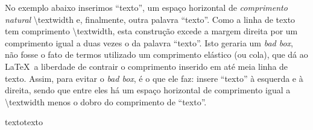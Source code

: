 \documentclass[a4paper,12pt]{article}
\newcommand{\comando}[1]{{\textbackslash\color{blue!70}\normalfont #1}}
\newcommand{\foreign}[1]{\textsl{#1}}
\begin{document}
	
	No exemplo abaixo inserimos ``texto'', um espaço horizontal de \emph{comprimento natural} \comando{textwidth} e, finalmente, outra palavra ``texto''. Como a linha de texto tem comprimento \comando{textwidth}, esta construção excede a margem direita por um comprimento igual a duas vezes o da palavra ``texto''. Isto geraria um \foreign{bad box}, não fosse o fato de termos utilizado um comprimento elástico (ou cola), que dá ao \LaTeX\ a liberdade de contrair o comprimento inserido em até meia linha de texto. Assim, para evitar o \foreign{bad box}, é o que ele faz: insere ``texto'' à esquerda e à direita, sendo que entre eles há um espaço horizontal de comprimento igual a \comando{textwidth} menos o dobro do comprimento de ``texto''.
	
	\bigskip
	
	\noindent texto\hspace{\textwidth minus 0.5\textwidth}texto
	
		
\end{document}
